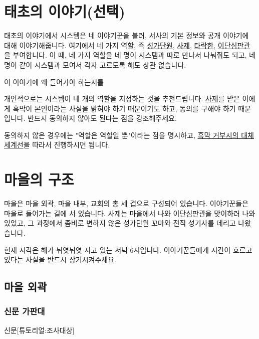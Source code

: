 \documentclass{report}
\begin{document}
	\section{태초의 이야기(선택)}
		태초의 이야기에서 시스템은 네 이야기꾼을 불러, 서사의 기본 정보와 공개 이야기에 대해 이야기해줍니다. 여기에서 네 가지 역할, 즉 \hyperlink{cursed-bard}{성가단원}, \hyperlink{cowardly-priest}{사제}, \hyperlink{corrupt-paladin}{타락한}, \hyperlink{hurt-rogue}{이단심판관}을 부여합니다. 이 때, 네 가지 역할을 네 명이 시스템과 따로 만나서 나눠줘도 되고, 네명이 같이 시스템과 모여서 각자 고르도록 해도 상관 없습니다.
		
		이 이야기에 왜 들어가야 하는지를 
		
		개인적으로는 시스템이 네 개의 역할을 지정하는 것을 추천드립니다. \hyperlink{cowardly-priest}{사제}를 받은 이에게 흑막이 본인이라는 사실을 밝혀야 하기 때문이기도 하고, 동의를 구해야 하기 때문입니다. 반드시 동의하지 않아도 된다는 점을 강조해주세요.
		
		동의하지 않은 경우에는 "역할은 역할일 뿐"이라는 점을 명시하고, \hyperlink{alternative:no-criminal}{흑막 거부시의 대체 세계선}을 따라서 진행하시면 됩니다.
	
	\section{마을의 구조}
		마을은 마을 외곽, 마을 내부, 교회의 총 세 겹으로 구성되어 있습니다. 이야기꾼들은 마을로 들어가는 길에 서 있습니다. 사제는 마을에서 나와 이단심판관을 맞이하러 나와있었고, 그 과정에서 좀비로 변하지 않은 성가단원 꼬마와 전직 성기사를 데리고 나왔습니다.
		
		현재 시각은 해가 뉘엿뉘엿 지고 있는 저녁 6시입니다. 이야기꾼들에게 시간이 흐르고 있다는 사실을 반드시 상기시켜주세요.
		
			\subsection{마을 외곽}
				\hypertarget{search:newspaper-stand}{}
				\subsubsection*{신문 가판대}
					\begin{spoiler}{신문}{[튜토리얼:조사대상]}
						
					\end{spoiler}
				
\end{document}
